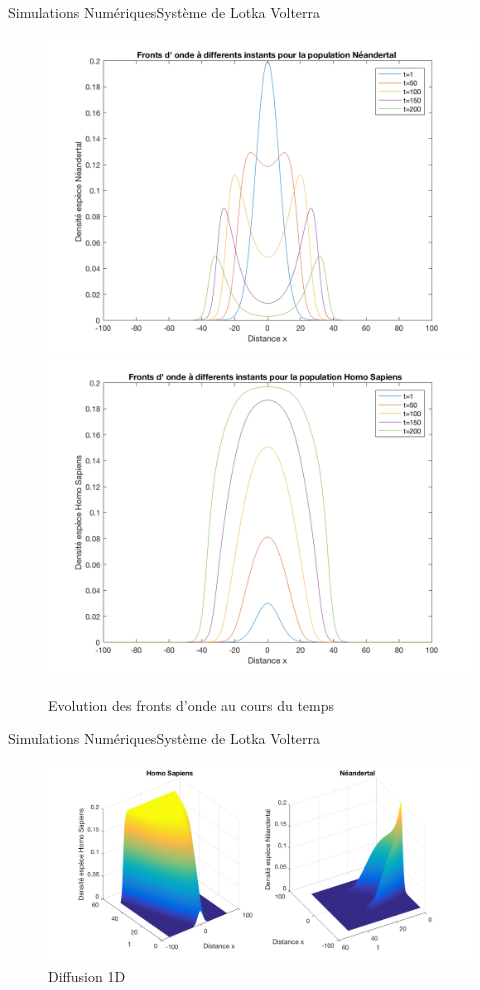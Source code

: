 \documentclass[10pt]{beamer}
\begin{document}
\begin{frame}{Simulations Numériques}{Système de Lotka Volterra}
\begin{figure}[H]
\centering
\includegraphics[width=0.48\linewidth]{Comp/neand.png}
\includegraphics[width=0.48\linewidth]{Comp/homo.png}
\caption{Evolution des fronts d'onde au cours du temps}
\end{figure}
\end{frame}

\begin{frame}{Simulations Numériques}{Système de Lotka Volterra}
\begin{figure}[H]
\centering
\includegraphics[scale=0.2]{Comp/CompDiff2.png}
\caption{Diffusion 1D}
\end{figure}
\end{frame}
\end{document}
